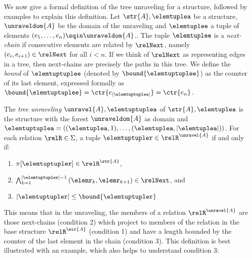 \noindent
We now give a formal definition of the tree unraveling for a structure, followed by examples to explain this definition.
Let $\str{A}, \elemtuplea$ be a structure, $\unraveldom{A}$ be the domain of the unraveling and $\elemtuplee$ a tuple of elements $(e_{1}, \ldots, e_{n}) \sqin \unraveldom{A}$..
The tuple $\elemtuplee$ is a \emph{next-chain} if consecutive elements are related by $\relNext$, namely $(e_{i}, e_{i+1}) \in \relNext$ for all $i < n$.
If we think of $\relNext$ as representing edges in a tree, then next-chains are precisely the paths in this tree.
We define the \emph{bound} of $\elemtuptuplee$ (denoted by $\bound{\elemtuptuplee}$) as the counter of its last element, expressed formally as $\bound{\elemtuptuplee} = \ctr{e_{|\elemtuptuplee|}} = \ctr{e_{n}}$.
\begin{definition}
The \emph{tree unraveling} $\unravel{A}, \elemtuptuplea$ of $\str{A}, \elemtuplea$ is the structure with the forest $\unraveldom{A}$ as domain and $\elemtuptuplea = ((\elemtuplea, 1), \ldots, (\elemtuplea, |\elemtuplea|))$.
For each relation $\relR \in \Sigma$, a tuple $\elemtuptupler \in \relR^{\unravel{A}}$ if and only if:
\begin{enumerate}
  \item $\pi[\elemtuptupler] \in \relR^{\str{A}}$,
  \item $\bigwedge_{k=1}^{|\elemtuptupler|-1}{(\elemr_{k},\elemr_{k+1}) \in \relNext}$, and
  \item $|\elemtuptupler| \le \bound{\elemtuptupler}$
\end{enumerate}
\end{definition}
This means that in the unraveling, the members of a relation $\relR^{\unravel{A}}$ are those next-chains (condition 2) which project to members of the relation in the base structure $\relR^{\str{A}}$ (condition 1) and have a length bounded by the counter of the last element in the chain (condition 3).
This definition is best illustrated with an example, which also helps to understand condition 3:

